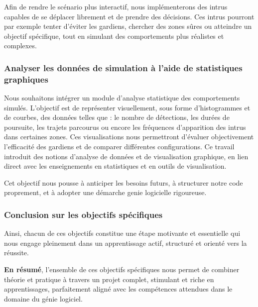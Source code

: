 Afin de rendre le scénario plus interactif, nous implémenterons des intrus capables de se déplacer librement et de prendre des décisions. Ces intrus pourront par exemple tenter d’éviter les gardiens, chercher des zones sûres ou atteindre un objectif spécifique, tout en simulant des comportements plus réalistes et complexes.
\subsubsection{Analyser les données de simulation à l’aide de statistiques graphiques}

Nous souhaitons intégrer un module d’analyse statistique des comportements simulés. L’objectif est de représenter visuellement, sous forme d’histogrammes et de courbes, des données telles que : le nombre de détections, les durées de poursuite, les trajets parcourus ou encore les fréquences d’apparition des intrus dans certaines zones. Ces visualisations nous permettront d’évaluer objectivement l’efficacité des gardiens et de comparer différentes configurations. Ce travail introduit des notions d’analyse de données et de visualisation graphique, en lien direct avec les enseignements en statistiques et en outils de visualisation.

Cet objectif nous pousse à anticiper les besoins futurs, à structurer notre code proprement, et à adopter une démarche genie logicielle rigoureuse.

\vspace{1em}

\subsubsection{Conclusion sur les objectifs spécifiques}

\vspace{0.5em}

Ainsi, chacun de ces objectifs constitue une étape motivante et essentielle qui nous engage pleinement dans un apprentissage actif, structuré et orienté vers la réussite.

\vspace{1em}

\noindent \textbf{En résumé}, l’ensemble de ces objectifs spécifiques nous permet de combiner théorie et pratique à travers un projet complet, stimulant et riche en apprentissages, parfaitement aligné avec les compétences attendues dans le domaine du génie logiciel.
